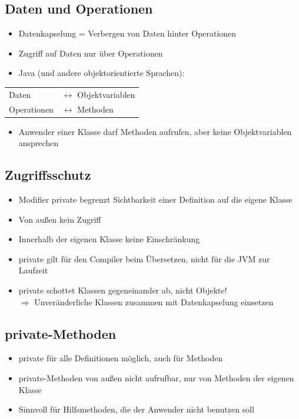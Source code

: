 \subsection{Daten und Operationen}
\begin{itemize}
\item Datenkapselung = Verbergen von Daten hinter Operationen
\item Zugriff auf Daten nur über Operationen
\item Java (und andere objektorientierte Sprachen):
\end{itemize}
\begin{tabular}{ll}
Daten & $\leftrightarrow$ Objektvariablen\\
Operationen & $\leftrightarrow$ Methoden\\
\end{tabular}
\begin{itemize}
\item Anwender einer Klasse darf Methoden aufrufen, aber keine Objektvariablen ansprechen
\end{itemize}

\subsection{Zugriffsschutz}
\begin{itemize}
\item Modifier private begrenzt Sichtbarkeit einer Definition auf die eigene Klasse
\item Von außen kein Zugriff
\item Innerhalb der eigenen Klasse keine Einschränkung
\item private gilt für den Compiler beim Übersetzen, nicht für die JVM zur Laufzeit
\item private schottet Klassen gegeneinander ab, nicht Objekte!\\
$\Rightarrow$ Unveränderliche Klassen zusammen mit Datenkapselung einsetzen
\end{itemize}

\subsection{private-Methoden}
\begin{itemize}
\item private für alle Definitionen möglich, auch für Methoden
\item  private-Methoden von außen nicht aufrufbar, nur von Methoden der eigenen Klasse
\item Sinnvoll für Hilfsmethoden, die der Anwender nicht benutzen soll
\end{itemize}

